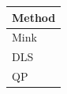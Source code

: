 \begin{tabular}{l}
\toprule
Method & \\
\midrule
Mink & \\
DLS & \\
QP & \\
\bottomrule
\end{tabular}
